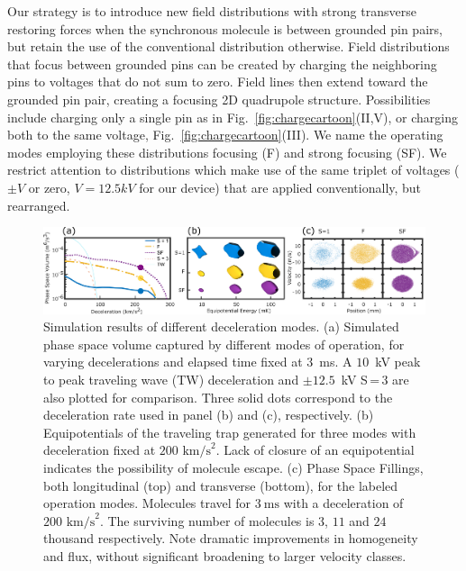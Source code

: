\documentclass[%
 reprint,
 amsmath,amssymb,
 aps,
prl,
]{revtex4-1}
\begin{document}
Our strategy is to introduce new field distributions with strong transverse restoring forces when the synchronous molecule is between grounded pin pairs, but retain the use of the conventional distribution otherwise. 
Field distributions that focus between grounded pins can be created by charging the neighboring pins to voltages that do not sum to zero.
Field lines then extend toward the grounded pin pair, creating a focusing 2D quadrupole structure.
Possibilities include charging only a single pin as in Fig.~\ref{fig:chargecartoon}(II,V), or charging both to the same voltage, Fig.~\ref{fig:chargecartoon}(III).
We name the operating modes employing these distributions focusing (F) and strong focusing (SF).
We restrict attention to distributions which make use of the same triplet of voltages ($\pm V$ or zero, $V=12.5 kV$ for our device) that are applied conventionally, but rearranged.


\begin{figure}[t]
\includegraphics[width=\linewidth]{Figure2.png}%
\vspace{-2mm}
\caption{
Simulation results of different deceleration modes. 
(a) Simulated phase space volume captured by different modes of operation, for varying decelerations and elapsed time fixed at $3$~ms. 
A $10$~kV peak to peak traveling wave (TW) deceleration and $\pm 12.5$~kV S\,=\,3 are also plotted for comparison. 
Three solid dots correspond to the deceleration rate used in panel (b) and (c), respectively. 
(b) Equipotentials of the traveling trap generated for three modes with deceleration fixed at $200 \text{ km/s}^2$. 
Lack of closure of an equipotential indicates the possibility of molecule escape. 
(c) Phase Space Fillings, both longitudinal (top) and transverse (bottom), for the labeled operation modes.
Molecules travel for $3~\text{ms}$ with a deceleration of $200 \text{ km/s}^2$. 
The surviving number of molecules is $3$, $11$ and $24$ thousand respectively. 
Note dramatic improvements in homogeneity and flux, without significant broadening to larger velocity classes.
\vspace{-4mm}}
\label{fig:efftrap}
\end{figure}
\end{document}
